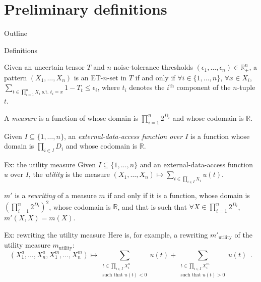 \documentclass{beamer}
\begin{document}
\section{Preliminary definitions}
\begin{frame}{Outline}
  \tableofcontents[currentsection]
\end{frame}

\begin{frame}[allowframebreaks]{Definitions}
  \begin{definition}[ET-$n$-set]
  Given an uncertain tensor $T$ and $n$ noise-tolerance thresholds
  $(\epsilon_1, \dots, \epsilon_n) \in \mathbb{R}_+^n$, a pattern
  $(X_1, \dots, X_n)$ is an ET-$n$-set in $T$ if and only if $\forall i
  \in \{1, \dots, n\}$, $\forall x \in X_i$, $\sum_{t \in \prod_{i =
      1}^n X_i\text{ s.t. }t_i = x} 1 - T_t \leq \epsilon_i$, where
  $t_i$ denotes the $i^{\text{th}}$ component of the $n$-tuple $t$.
  \end{definition}
  
  \begin{definition}[Measure]
  \label{def:measure}
  A \emph{measure} is a function of whose domain is $\prod_{i = 1}^n
  2^{D_i}$ and whose codomain is $\mathbb{R}$.
  \end{definition}

\framebreak  
  \begin{definition}
  Given $I \subseteq \{1, \dots, n\}$, an \emph{external-data-access
    function over $I$} is a function whose domain is $\prod_{i \in I}
  D_i$ and whose codomain is $\mathbb{R}$.
  \end{definition}

  \begin{block}{Ex: the utility measure}
  Given $I \subseteq \{1, \dots, n\}$ and an external-data-access
  function $u$ over $I$, the \emph{utility} is the measure $(X_1,
  \dots, X_n) \mapsto \sum_{t \in \prod_{i \in I} X_i} u(t)$.
  \end{block}
  
\framebreak
  \begin{definition}[Rewriting]
  $m'$ is a \emph{rewriting} of a measure $m$ if and only if it is a
  function, whose domain is $\left(\prod_{i = 1}^n 2^{D_i}\right)^2$,
  whose codomain is $\mathbb{R}$, and that is such that $\forall X \in
  \prod_{i = 1}^n 2^{D_i}$, $m'(X, X) = m(X)$.
  \end{definition}
  
   \begin{block}{Ex: rewriting the utility measure}
  Here is, for example, a rewriting $m'_{\text{utility}}$ of the utility
measure $m_{\text{utility}}$:
  \begin{equation*}
  (X^a_1, \dots, X^a_n, X^m_1, \dots, X^m_n) \mapsto \sum_{\substack{t
      \in \prod_{i \in I} X_i^a\\\text{such that }u(t) < 0}} u(t) +
  \sum_{\substack{t \in \prod_{i \in I}X_i^m\\\text{such that }u(t) >
      0}} u(t) \enspace .
  \end{equation*}
  \end{block}
  

\end{frame}
\end{document}
